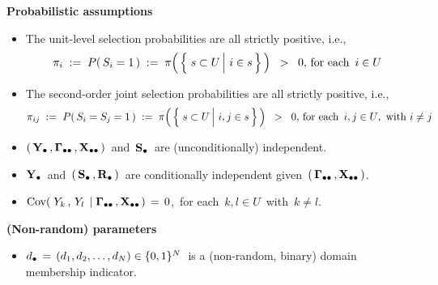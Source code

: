 \vskip 0.2cm
\noindent
\textbf{Probabilistic assumptions}
\begin{itemize}
\item
    The unit-level selection probabilities are all strictly positive, i.e.,
    \begin{equation*}
    \pi_{i}
    \; := \;
        P(\,S_{i} = 1\,)
    \; := \;
        \pi\!\left(\,\left\{\,
            \left.
            s \overset{{\color{white}.}}{\subset} U
            \,\right\vert\,
            i \in s
            \,\right\}
        \,\right)
    \;\; > \;\;
        0,\,
    \textnormal{for each \,$i \in U$\,
    }
    \end{equation*}
\item
    The second-order joint selection probabilities are all strictly positive, i.e.,
    \begin{equation*}
    \pi_{ij}
    \; := \;
        P(\,S_{i} = S_{j} = 1\,)
    \; := \;
        \pi\!\left(\,\left\{\,
            \left.
            s \overset{{\color{white}.}}{\subset} U
            \,\right\vert\,
            i, j \in s
            \,\right\}
        \,\right)
    \;\; > \;\;
        0,\,
    \textnormal{for each \,$i,j \in U$,\, with $i \neq j$}
    \end{equation*}
\item
    $\left(\,\mathbf{Y}_{\bullet}\,,\mathbf{\Gamma}_{\bullet\bullet}\,,\mathbf{X}_{\bullet\bullet}\,\right)$\, and \,$\mathbf{S}_{\bullet}$\, are (unconditionally) independent.
\item
    $\mathbf{Y}_{\bullet}$\, and \,$(\,\mathbf{S}_{\bullet}\,,\mathbf{R}_{\bullet}\,)$\,
    are {\color{red}conditionally independent} given
    \,$(\,\mathbf{\Gamma}_{\bullet\bullet}\,,\mathbf{X}_{\bullet\bullet}\,)$.
\item
    $\textnormal{Cov}\!\left(\;Y_{k}\,,\,Y_{l}\;\left\vert\;\mathbf{\Gamma}_{\bullet\bullet}\,,\mathbf{X}_{\bullet\bullet}\right.\right) \,=\, 0$,\,
    for each \,$k, l \in U$\, with \,$k \neq l$.
\end{itemize}

\vskip 0.2cm
\noindent
\textbf{(Non-random) parameters}
\begin{itemize}
\item
    $d_{\bullet} \,=\, (d_{1},d_{2},\ldots,d_{N}) \in \{0,1\}^{N}$\,
    is a (non-random, binary) domain membership indicator.
\end{itemize}

